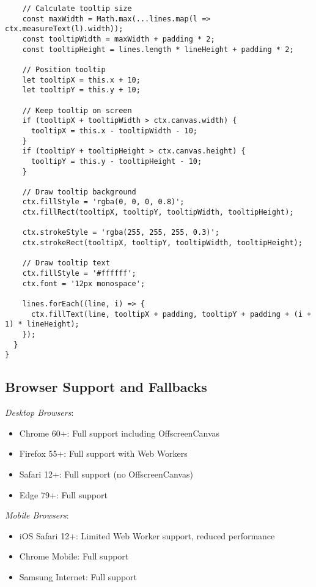 \documentclass[11pt]{article}
\begin{document}
\begin{verbatim}
    // Calculate tooltip size
    const maxWidth = Math.max(...lines.map(l => ctx.measureText(l).width));
    const tooltipWidth = maxWidth + padding * 2;
    const tooltipHeight = lines.length * lineHeight + padding * 2;
    
    // Position tooltip
    let tooltipX = this.x + 10;
    let tooltipY = this.y + 10;
    
    // Keep tooltip on screen
    if (tooltipX + tooltipWidth > ctx.canvas.width) {
      tooltipX = this.x - tooltipWidth - 10;
    }
    if (tooltipY + tooltipHeight > ctx.canvas.height) {
      tooltipY = this.y - tooltipHeight - 10;
    }
    
    // Draw tooltip background
    ctx.fillStyle = 'rgba(0, 0, 0, 0.8)';
    ctx.fillRect(tooltipX, tooltipY, tooltipWidth, tooltipHeight);
    
    ctx.strokeStyle = 'rgba(255, 255, 255, 0.3)';
    ctx.strokeRect(tooltipX, tooltipY, tooltipWidth, tooltipHeight);
    
    // Draw tooltip text
    ctx.fillStyle = '#ffffff';
    ctx.font = '12px monospace';
    
    lines.forEach((line, i) => {
      ctx.fillText(line, tooltipX + padding, tooltipY + padding + (i + 1) * lineHeight);
    });
  }
}
\end{verbatim}
\subsection{Browser Support and Fallbacks}
\label{sec:orgd3a8718}

\emph{Desktop Browsers}:

\begin{itemize}
\item Chrome 60+: Full support including OffscreenCanvas
\item Firefox 55+: Full support with Web Workers
\item Safari 12+: Full support (no OffscreenCanvas)
\item Edge 79+: Full support
\end{itemize}

\emph{Mobile Browsers}:

\begin{itemize}
\item iOS Safari 12+: Limited Web Worker support, reduced performance
\item Chrome Mobile: Full support
\item Samsung Internet: Full support
\end{itemize}
\end{document}

